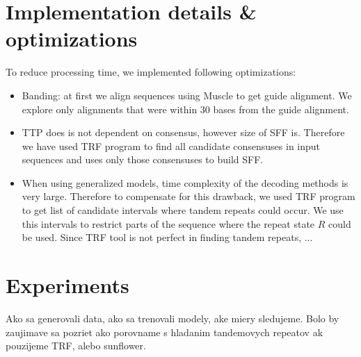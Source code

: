\section{Implementation details \& optimizations}

To reduce processing time, we implemented following optimizations:
\begin{itemize}[itemsep=-1mm]
\item Banding: at first we align sequences using Muscle\cite{} to get guide
alignment. We explore only alignments that were within 30 bases from the guide
alignment.

\item TTP does is not dependent on consensus, however size of SFF is. Therefore
we have used TRF program to find all candidate consensuses in input sequences
and uses only those consensuses to build SFF.

\item When using generalized models, time complexity of the decoding methods is
very large.  Therefore to compensate for this drawback, we used TRF program to
get list of candidate intervals where tandem repeats could occur. We use this
intervals to restrict parts of the sequence where the repeat state $R$ could be
used. Since TRF tool is not perfect in finding tandem repeats, ...

\end{itemize}

\section{Experiments}
\begin{reformulate*}
Ako sa generovali data, ako sa trenovali modely, ake miery sledujeme.  Bolo by
zaujimave sa pozriet ako porovname s hladanim tandemovych repeatov ak pouzijeme
TRF, alebo sunflower.

\end{reformulate*}


